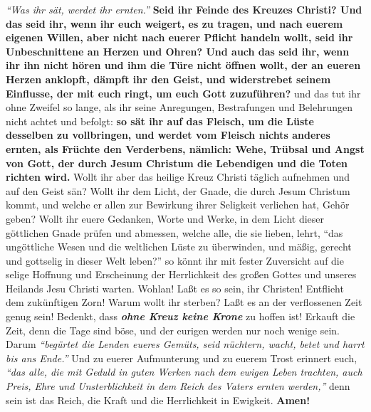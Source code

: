 \textit{"`Was ihr sät, werdet ihr ernten."'}
\label{ref:18_11_feinde_des_kreuzes}
\textbf{Seid ihr Feinde des Kreuzes Christi? Und das seid
ihr, wenn ihr euch weigert, es zu tragen, und nach euerem eigenen Willen, aber
nicht nach euerer Pflicht handeln wollt, seid ihr
Unbeschnittene an Herzen und
Ohren? Und auch das seid ihr, wenn ihr ihn nicht hören und ihm die Türe nicht
öffnen wollt, der an eueren Herzen anklopft, dämpft ihr den Geist, und
widerstrebet seinem Einflusse, der mit euch ringt, um euch Gott zuzuführen?}
und das tut ihr ohne Zweifel so lange, als ihr seine Anregungen, Bestrafungen
und Belehrungen nicht achtet und befolgt: \textbf{so sät ihr auf das Fleisch,
um die
Lüste desselben zu vollbringen, und werdet vom Fleisch nichts anderes ernten,
als Früchte den Verderbens, nämlich: Wehe, Trübsal und Angst von Gott, der durch
Jesum Christum die Lebendigen und die Toten richten wird.} Wollt ihr aber
das heilige Kreuz Christi täglich aufnehmen und auf den Geist sän? Wollt ihr
dem Licht, der Gnade, die durch Jesum Christum kommt, und welche er allen
zur Bewirkung ihrer Seligkeit verliehen hat, Gehör geben? Wollt ihr euere
Gedanken, Worte und Werke, in dem Licht dieser göttlichen
Gnade prüfen und
abmessen, welche alle, die sie lieben, lehrt,
"`das ungöttliche Wesen und die
weltlichen Lüste zu überwinden, und mäßig, gerecht
und gottselig in dieser Welt
leben?"'
so könnt ihr mit fester Zuversicht auf
die selige Hoffnung und Erscheinung der Herrlichkeit des großen Gottes und
unseres Heilands Jesu Christi warten.
Wohlan! Laßt es so
sein, ihr Christen! Entflieht dem zukünftigen Zorn! Warum wollt ihr sterben?
Laßt es an der verflossenen Zeit genug sein! Bedenkt, dass \textbf{\textit{ohne
Kreuz keine
Krone}} zu hoffen ist! Erkauft die Zeit, denn die
Tage sind böse, und der
eurigen werden nur noch wenige sein.
Darum
\textit{"`begürtet die
Lenden eueres Gemüts, seid nüchtern, wacht, betet und harrt bis ans
Ende."'}
Und zu euerer Aufmunterung und zu euerem Trost erinnert euch,
\textit{"`das alle, die mit
Geduld in guten Werken nach dem ewigen Leben trachten, auch Preis, Ehre und
Unsterblichkeit in dem Reich des Vaters ernten werden,"'}
denn sein ist das Reich, die Kraft und die Herrlichkeit in Ewigkeit.
\textbf{Amen!}



